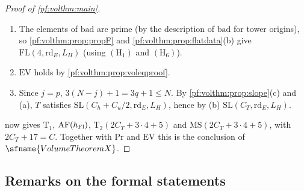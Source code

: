 \begin{proof}[Proof of \cref{pf:volthm:main}]
\begin{enumerate}[label=(\arabic*)]
\item The elements of $\mathrm{bad}$ are prime (by the description of $\mathrm{bad}$ for tower origins), so
  \cref{pf:volthm:prop:propF} and \cref{pf:volthm:prop:flatdata}(b) give $\mathrm{FL}(4,\mathrm{rd}_E,L_H)$ (using
  $(\mathrm{H}_1)$ and $(\mathrm{H}_6)$).
\item $\mathrm{EV}$ holds by \cref{pf:volthm:prop:voleqproof}.
\item Since $j=p$, $3(N-j)+1=3q+1\le N$. By \cref{pf:volthm:prop:slope}(c) and (a), $T$ satisfies
  $\mathrm{SL}(C_h+C_u/2,\mathrm{rd}_E,L_H)$, hence by (b) $\mathrm{SL}(C_T,\mathrm{rd}_E,L_H)$.
\end{enumerate}
 now gives $\mathrm{T}_1$, $\mathrm{AF}(h_{\mathrm{Fl}})$, $\mathrm{T}_2(2C_T+3\cdot4+5)$ and
$\mathrm{MS}(2C_T+3\cdot4+5)$, with $2C_T+17=C$. Together with $\mathrm{Pr}$ and $\mathrm{EV}$ this is
the conclusion of $\sfname{VolumeTheoremX}$.
\end{proof}

\subsection{Remarks on the formal statements}\label{pf:volthm:sec:remarks}

